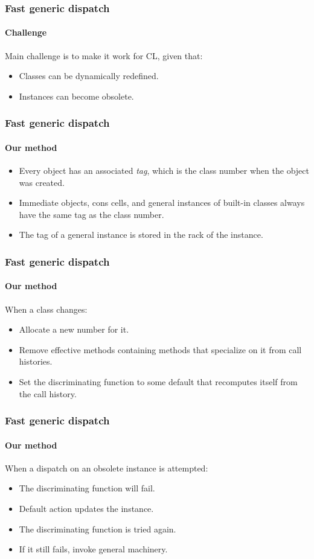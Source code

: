 \documentclass[12pt]{beamer}
\begin{document}
\begin{frame}
  \frametitle{Fast generic dispatch}
  \framesubtitle{Challenge}

  Main challenge is to make it work for CL, given that:

  \begin{itemize}
  \item Classes can be dynamically redefined.
  \item Instances can become obsolete.
  \end{itemize}

\end{frame}
\begin{frame}
  \frametitle{Fast generic dispatch}
  \framesubtitle{Our method}

  \begin{itemize}
  \item Every object has an associated \emph{tag}, which is the class
    number when the object was created.
  \item Immediate objects, cons cells, and general instances of
    built-in classes always have the same tag as the class number.
  \item The tag of a general instance is stored in the rack of the
    instance. 
  \end{itemize}

\end{frame}
\begin{frame}
  \frametitle{Fast generic dispatch}
  \framesubtitle{Our method}

  When a class changes:

  \begin{itemize}
  \item Allocate a new number for it.
  \item Remove effective methods containing methods that specialize on
    it from call histories.
  \item Set the discriminating function to some default that
    recomputes itself from the call history.
  \end{itemize}

\end{frame}
\begin{frame}
  \frametitle{Fast generic dispatch}
  \framesubtitle{Our method}

  When a dispatch on an obsolete instance is attempted:

  \begin{itemize}
  \item The discriminating function will fail.
  \item Default action updates the instance. 
  \item The discriminating function is tried again.
  \item If it still fails, invoke general machinery.
  \end{itemize}

\end{frame}
\end{document}
